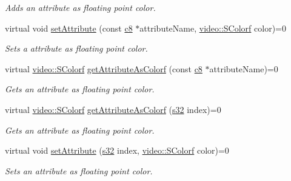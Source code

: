 \begin{DoxyCompactItemize}
\begin{DoxyCompactList}\small\item\em Adds an attribute as floating point color. \end{DoxyCompactList}\item 
\mbox{\label{classirr_1_1io_1_1IAttributes_a360d6ab48ca8d2bfc727e0aeab34c44b}} 
virtual void \hyperlink{classirr_1_1io_1_1IAttributes_a360d6ab48ca8d2bfc727e0aeab34c44b}{set\+Attribute} (const \hyperlink{namespaceirr_a9395eaea339bcb546b319e9c96bf7410}{c8} $\ast$attribute\+Name, \hyperlink{classirr_1_1video_1_1SColorf}{video\+::\+S\+Colorf} color)=0
\begin{DoxyCompactList}\small\item\em Sets a attribute as floating point color. \end{DoxyCompactList}\item 
virtual \hyperlink{classirr_1_1video_1_1SColorf}{video\+::\+S\+Colorf} \hyperlink{classirr_1_1io_1_1IAttributes_ac072aeae816dd06e196eafb910511d2b}{get\+Attribute\+As\+Colorf} (const \hyperlink{namespaceirr_a9395eaea339bcb546b319e9c96bf7410}{c8} $\ast$attribute\+Name)=0
\begin{DoxyCompactList}\small\item\em Gets an attribute as floating point color. \end{DoxyCompactList}\item 
virtual \hyperlink{classirr_1_1video_1_1SColorf}{video\+::\+S\+Colorf} \hyperlink{classirr_1_1io_1_1IAttributes_a3400093bf32360c0b2916b94ad0bdbdd}{get\+Attribute\+As\+Colorf} (\hyperlink{namespaceirr_ac66849b7a6ed16e30ebede579f9b47c6}{s32} index)=0
\begin{DoxyCompactList}\small\item\em Gets an attribute as floating point color. \end{DoxyCompactList}\item 
\mbox{\label{classirr_1_1io_1_1IAttributes_a9f5e93e5ee0f270973de42ad32b0b616}} 
virtual void \hyperlink{classirr_1_1io_1_1IAttributes_a9f5e93e5ee0f270973de42ad32b0b616}{set\+Attribute} (\hyperlink{namespaceirr_ac66849b7a6ed16e30ebede579f9b47c6}{s32} index, \hyperlink{classirr_1_1video_1_1SColorf}{video\+::\+S\+Colorf} color)=0
\begin{DoxyCompactList}\small\item\em Sets an attribute as floating point color. \end{DoxyCompactList}\item 

\end{DoxyCompactItemize}
